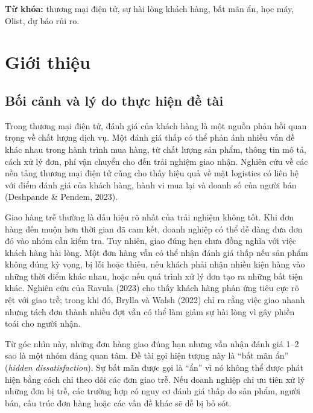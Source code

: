 \documentclass[12pt,a4paper]{report}
\begin{document}
\par\medskip
\noindent\textbf{Từ khóa:} thương mại điện tử, sự hài lòng khách hàng, bất mãn ẩn, học máy, Olist, dự báo rủi ro.
\clearpage{}

\chapter{Giới thiệu}
\label{chap:gioi-thieu}

\section{Bối cảnh và lý do thực hiện đề tài}
\label{sec:boi-canh}

Trong thương mại điện tử, đánh giá của khách hàng là một nguồn phản hồi quan trọng về chất lượng dịch vụ. Một đánh giá thấp có thể phản ánh nhiều vấn đề khác nhau trong hành trình mua hàng, từ chất lượng sản phẩm, thông tin mô tả, cách xử lý đơn, phí vận chuyển cho đến trải nghiệm giao nhận. Nghiên cứu về các nền tảng thương mại điện tử cũng cho thấy hiệu quả về mặt logistics có liên hệ với điểm đánh giá của khách hàng, hành vi mua lại và doanh số của người bán (Deshpande \& Pendem, 2023).

Giao hàng trễ thường là dấu hiệu rõ nhất của trải nghiệm không tốt. Khi đơn hàng đến muộn hơn thời gian đã cam kết, doanh nghiệp có thể dễ dàng đưa đơn đó vào nhóm cần kiểm tra. Tuy nhiên, giao đúng hẹn chưa đồng nghĩa với việc khách hàng hài lòng. Một đơn hàng vẫn có thể nhận đánh giá thấp nếu sản phẩm không đúng kỳ vọng, bị lỗi hoặc thiếu, nếu khách phải nhận nhiều kiện hàng vào những thời điểm khác nhau, hoặc nếu quá trình xử lý đơn tạo ra những bất tiện khác. Nghiên cứu của Ravula (2023) cho thấy khách hàng phản ứng tiêu cực rõ rệt với giao trễ; trong khi đó, Brylla và Walsh (2022) chỉ ra rằng việc giao nhanh nhưng tách đơn thành nhiều đợt vẫn có thể làm giảm sự hài lòng vì gây phiền toái cho người nhận.

Từ góc nhìn này, những đơn hàng giao đúng hạn nhưng vẫn nhận đánh giá 1--2 sao là một nhóm đáng quan tâm. Đề tài gọi hiện tượng này là ``bất mãn ẩn'' (\emph{hidden dissatisfaction}). Sự bất mãn được gọi là ``ẩn'' vì nó không thể được phát hiện bằng cách chỉ theo dõi các đơn giao trễ. Nếu doanh nghiệp chỉ ưu tiên xử lý những đơn bị trễ, các trường hợp có nguy cơ đánh giá thấp do sản phẩm, người bán, cấu trúc đơn hàng hoặc các vấn đề khác sẽ dễ bị bỏ sót.
\end{document}
